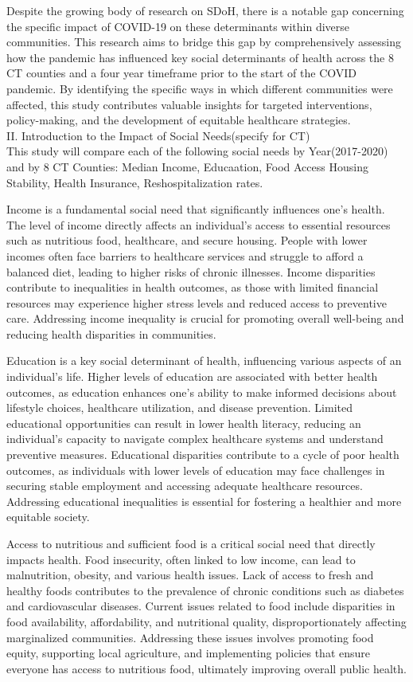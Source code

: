 \documentclass[12pt]{article}
\begin{document}
Despite the growing body of research on SDoH, there is a notable gap concerning the specific impact of COVID-19 on 
these determinants within diverse communities. This research aims to bridge this gap by comprehensively assessing how 
the pandemic has influenced key social determinants of health across the 8 CT counties and a four year timeframe prior to 
the start of the COVID pandemic. 
By identifying the specific ways in which different communities were affected, this study contributes valuable insights 
for targeted interventions, policy-making, and the development of equitable healthcare strategies.
\\
II. Introduction to the Impact of Social Needs(specify for CT)
\\
This study will compare each of the following social needs by Year(2017-2020) and by 8 CT Counties: 
Median Income,
Educaation,
Food Access
Housing Stability,
Health Insurance,
Reshospitalization rates.

Income is a fundamental
social need that significantly influences
one's health. The level of income
directly affects an individual's access
to essential resources such as nutritious
food, healthcare, and secure housing.
People with lower incomes often face
barriers to healthcare services and
struggle to afford a balanced diet,
leading to higher risks of chronic
illnesses. Income disparities contribute
to inequalities in health outcomes, as
those with limited financial resources
may experience higher stress levels and
reduced access to preventive care.
Addressing income inequality is crucial
for promoting overall well-being and
reducing health disparities in communities.

Education is a key social determinant
of health, influencing various aspects
of an individual's life. Higher levels
of education are associated with better
health outcomes, as education enhances
one's ability to make informed decisions
about lifestyle choices, healthcare
utilization, and disease prevention.
Limited educational opportunities can
result in lower health literacy, reducing
an individual's capacity to navigate
complex healthcare systems and understand
preventive measures. Educational
disparities contribute to a cycle of
poor health outcomes, as individuals
with lower levels of education may face
challenges in securing stable employment
and accessing adequate healthcare
resources. Addressing educational
inequalities is essential for fostering
a healthier and more equitable society.

Access to nutritious and sufficient
food is a critical social need that
directly impacts health. Food insecurity,
often linked to low income, can lead to
malnutrition, obesity, and various health
issues. Lack of access to fresh and
healthy foods contributes to the prevalence
of chronic conditions such as diabetes
and cardiovascular diseases. Current
issues related to food include disparities
in food availability, affordability, and
nutritional quality, disproportionately
affecting marginalized communities.
Addressing these issues involves promoting
food equity, supporting local agriculture,
and implementing policies that ensure
everyone has access to nutritious food,
ultimately improving overall public health.
\end{document}
